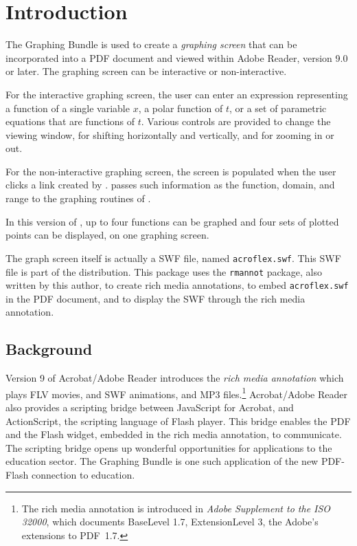 \documentclass{article}
\begin{document}
\maketitle

\tableofcontents
{}

\section{Introduction}

The \textbf{{\AcroFLeX}} Graphing Bundle is used to create a
\emph{graphing screen} that can be incorporated into a PDF document
and viewed within Adobe Reader, version 9.0 or later. The graphing
screen can be interactive or non-interactive.

For the interactive graphing screen, the user can enter an
expression representing a function of a single variable $x$, a polar
function of $t$, or a set of parametric equations that are functions
of $t$. Various controls are provided to change the viewing window,
for shifting horizontally and vertically, and for zooming in or out.

For the non-interactive graphing screen, the screen is populated
when the user clicks a link created by .
 passes such information as the function,
domain, and range to the graphing routines of {\AcroFLeX}.

In this version of {\AcroFLeX}, up to four functions can be graphed
and four sets of plotted points can be displayed, on one graphing
screen.

The graph screen itself is actually a SWF file, named
\texttt{acroflex.swf}. This SWF file is part of the {\AcroFLeX}
distribution. This package uses the \texttt{rmannot} package, also
written by this author, to create rich media annotations, to embed
\texttt{acroflex.swf} in the PDF document, and to display the SWF through
the rich media annotation.

\subsection{Background}

Version 9 of Acrobat/Adobe Reader introduces the \textit{rich media
annotation} which plays FLV movies, and SWF animations, and MP3 files.\footnote{%
The rich media annotation is introduced in
\textsl{Adobe Supplement to the ISO 32000}, which documents
BaseLevel 1.7, ExtensionLevel 3, the Adobe's extensions to PDF~1.7.}
Acrobat/Adobe Reader also provides a scripting bridge between
JavaScript for Acrobat, and ActionScript, the scripting language of
Flash player. This bridge enables the PDF and the Flash widget,
embedded in the rich media annotation, to communicate. The scripting
bridge opens up wonderful opportunities for applications to the
education sector. The {\AcroFLeX} Graphing Bundle is one such
application of the new PDF-Flash connection to education.
\end{document}
